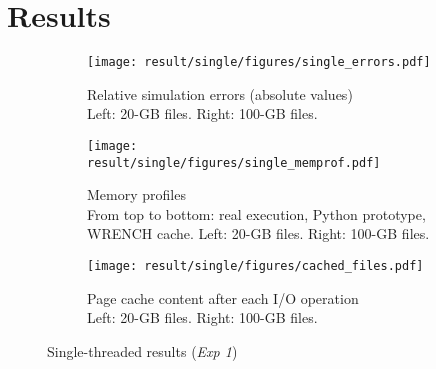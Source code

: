 \documentclass[conference]{IEEEtran}
\newcommand{\wrench}{WRENCH\xspace}
\begin{document}


    \section{Results}
    \label{results}

    \begin{figure*}
        \centering
        \begin{subfigure}{\linewidth}
            \centering
               \texttt{[image: result/single/figures/single\_errors.pdf]} 
               \vspace*{-0.7cm}
               \caption{Relative simulation errors (absolute values)\\ Left: 20-GB files. Right: 100-GB files.}
                \vspace*{0.2cm}
               \label{fig:single_error}
            \end{subfigure}
        \begin{subfigure}{\linewidth}
            \centering
               \texttt{[image: result/single/figures/single\_memprof.pdf]}
               \vspace*{-0.7cm}
               \caption{Memory profiles\\ From top to bottom: real execution, Python prototype, WRENCH cache. Left: 20-GB files. Right: 100-GB files.}
               \vspace*{0.2cm}
               \label{fig:single_memprof}
        \end{subfigure}
        \begin{subfigure}{\linewidth}
            \centering
               \texttt{[image: result/single/figures/cached\_files.pdf]}
               \caption{Page cache content after each I/O operation\\Left: 20-GB files. Right: 100-GB files.}
               \label{fig:single_cache}
        \end{subfigure}
        \caption{Single-threaded results (\textit{Exp 1})}
        \end{figure*}
\end{document}
